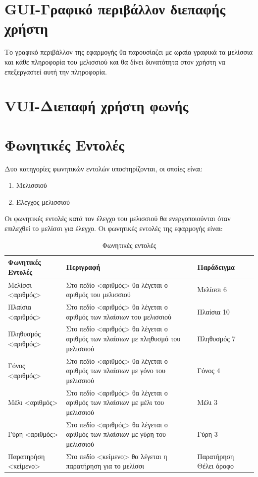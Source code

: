 \documentclass[oneside, 12pt]{book}
\begin{document}
\section{GUI-Γραφικό περιβάλλον διεπαφής χρήστη}
\label{sec:gui-γραφικό-περιβάλλον-χρήστη}
Το γραφικό περιβάλλον της εφαρμογής θα παρουσίαζει με ωραία γραφικά τα μελίσσια και κάθε πληροφορία
του μελισσιού και θα δίνει δυνατότητα στον χρήστη να επεξεργαστεί αυτή την πληροφορία.
\section{VUI-Διεπαφή χρήστη φωνής}
\label{sec:vui---διεπαφή-χρήστη-φωνής}
\section{Φωνητικές Εντολές}
\label{sec:φωνητικές-εντολές}
Δυο κατηγορίες φωνητικών εντολών υποστηρίζονται, οι οποίες είναι:
\begin{enumerate}
  \item Μελισσιού
  \item Έλεγχος μελισσιού
\end{enumerate}
Οι φωνητικές εντολές κατά τον έλεγχο του μελισσιού θα ενεργοποιούνται όταν επιλεχθεί το μελίσσι για έλεγχο.
Οι φωνητικές εντολές της εφαρμογής είναι:
\begin{table}[h]
  \centering
  \caption{Φωνητικές εντολές}
  \begin{tabularx}{\linewidth}[h]{|X|X|X|}
    \hline
    Φωνητικές Εντολές & Περιγραφή & Παράδειγμα \\
    \hline
    \hline
    Μελίσσι <αριθμός> & Στο πεδίο <αριθμός> θα λέγεται ο αριθμός του μελισσιού & Μελίσσι 6 \\
    \hline
    Πλαίσια <αριθμός> & Στο πεδίο <αριθμός> θα λέγεται ο αριθμός των πλαίσιων του μελισσιού & Πλαίσια 10 \\
    \hline
    Πληθυσμός <αριθμός> & Στο πεδίο <αριθμός> θα λέγεται ο αριθμός των πλαίσιων με πληθυσμό του μελισσιού & Πληθυσμός 7 \\
    \hline
    Γόνος <αριθμός> & Στο πεδίο <αριθμός> θα λέγεται ο αριθμός των πλαίσιων με γόνο του μελισσιού & Γόνος 4 \\
    \hline
    Μέλι <αριθμός> & Στο πεδίο <αριθμός> θα λέγεται ο αριθμός των πλαίσιων με μέλι του μελισσιού & Μέλι 3 \\
    \hline
    Γύρη <αριθμός> & Στο πεδίο <αριθμός> θα λέγεται ο αριθμός των πλαίσιων με γύρη του μελισσιού & Γύρη 3 \\
    \hline
    Παρατηρήση <κείμενο> & Στο πεδίο <κείμενο> θα λέγεται η παρατήρηση για το μελίσσι & Παρατήρηση Θέλει όροφο  \\
    \hline
  \end{tabularx}
  \label{tab:table3}
\end{table}
\end{document}

